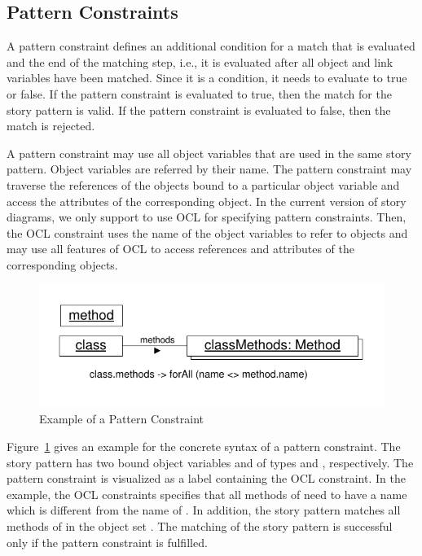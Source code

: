 {
\subsection{Pattern Constraints}

A pattern constraint defines an additional condition for a match that is evaluated and the end of the matching step, i.e., it is evaluated after all object and link variables have been matched. Since it is a condition, it needs to evaluate to true or false. If the pattern constraint is evaluated to true, then the match for the story pattern is valid. If the pattern constraint is evaluated to false, then the match is rejected.

A pattern constraint may use all object variables that are used in the same story pattern. Object variables are referred by their name. The pattern constraint may traverse the references of the objects bound to a particular object variable and access the attributes of the corresponding object. In the current version of story diagrams, we only support to use OCL for specifying pattern constraints. Then, the OCL constraint uses the name of the object variables to refer to objects and may use all features of OCL to access references and attributes of the corresponding objects.

\begin{figure}[htbp]
\center
\includegraphics[width=0.6\columnwidth]{figures/PatternConstraint}
\caption{Example of a Pattern Constraint}
\label{fig:patternConstraint}
\end{figure}

Figure~\ref{fig:patternConstraint} gives an example for the concrete syntax of a pattern constraint. The story pattern has two bound object variables  and  of types  and , respectively. The pattern constraint is visualized as a label containing the OCL constraint. In the example, the OCL constraints specifies that all methods of  need to have a name which is different from the name of . In addition, the story pattern matches all methods of  in the object set . The matching of the story pattern is successful only if the pattern constraint is fulfilled.

} %


